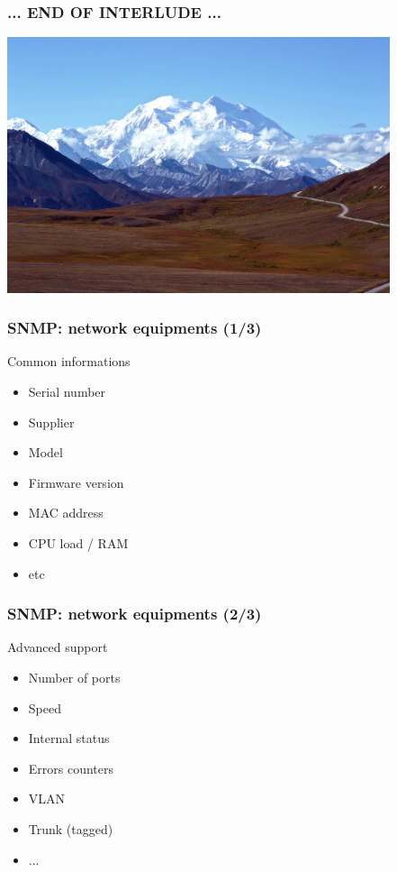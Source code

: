 \documentclass{beamer}
\begin{document}
\begin{frame}
    \frametitle{... END OF INTERLUDE ...}

    \includegraphics[height=7.5cm]{./pics/montagne.jpg}

\end{frame}



\begin{frame}
    \frametitle{SNMP: network equipments (1/3)}

    \begin{block}{Common informations}
    \begin{itemize}
    \item Serial number
    \item Supplier
    \item Model
    \item Firmware version
    \item MAC address
    \item CPU load / RAM
    \item etc
    \end{itemize}
    \end{block}
\end{frame}

\begin{frame}
    \frametitle{SNMP: network equipments (2/3)}

    \begin{block}{Advanced support}
    \begin{itemize}
    \item Number of ports
    \item Speed
    \item Internal status
    \item Errors counters
    \item VLAN
    \item Trunk (tagged)
    \item ...
    \end{itemize}
    \end{block}
\end{frame}
\end{document}
